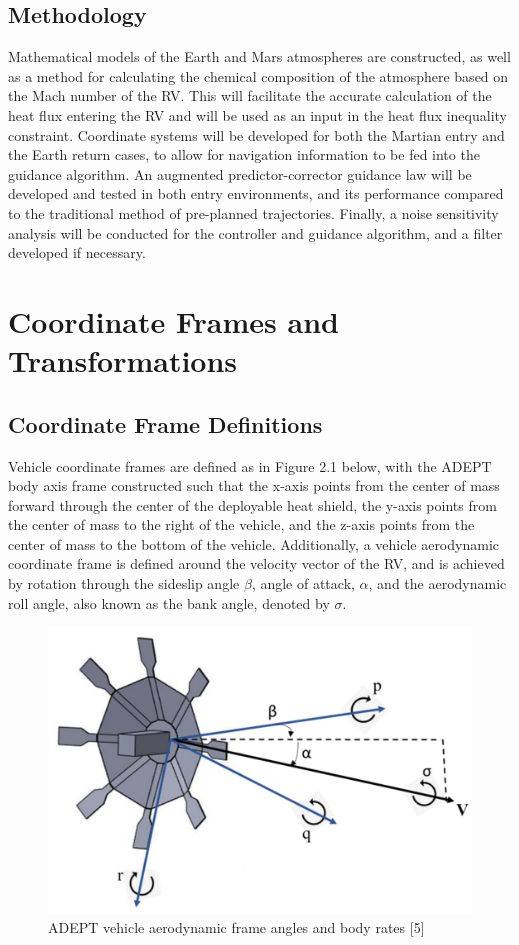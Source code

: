 \documentclass[12pt]{article}
\numberwithin{equation}{section}
\numberwithin{figure}{section}
\numberwithin{table}{section}
\begin{document}
\subsection{Methodology}
Mathematical models of the Earth and Mars atmospheres are constructed, as well as a method for calculating the chemical composition of the atmosphere based on the Mach number of the RV. This will facilitate the accurate calculation of the heat flux entering the RV and will be used as an input in the heat flux inequality constraint. Coordinate systems will be developed for both the Martian entry and the Earth return cases, to allow for navigation information to be fed into the guidance algorithm. An augmented predictor-corrector guidance law will be developed and tested in both entry environments, and its performance compared to the traditional method of pre-planned trajectories. Finally, a noise sensitivity analysis will be conducted for the controller and guidance algorithm, and a filter developed if necessary.

\section{Coordinate Frames and Transformations}
\subsection{Coordinate Frame Definitions}
Vehicle coordinate frames are defined as in Figure 2.1 below, with the ADEPT body axis frame constructed such that the x-axis points from the center of mass forward through the center of the deployable heat shield, the y-axis points from the center of mass to the right of the vehicle, and the z-axis points from the center of mass to the bottom of the vehicle. Additionally, a vehicle aerodynamic coordinate frame is defined around the velocity vector of the RV, and is achieved by rotation through the sideslip angle $\beta$, angle of attack, $\alpha$, and the aerodynamic roll angle, also known as the bank angle, denoted by $\sigma$.

\begin{figure}[h]
  \centering
  \includegraphics[width=1\textwidth]{Figures/Body_Frame_Angles.png}
  \caption{ADEPT vehicle aerodynamic frame angles and body rates [5]}
  \label{fig:Aero_angs}
\end{figure}
\end{document}
